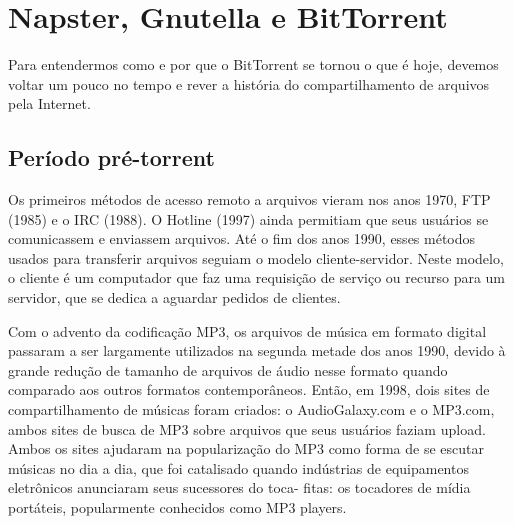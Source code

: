 
\chapter{Napster, Gnutella e BitTorrent}

\begin{comment}
Vou contar a história do BitTorrent, desde o aumento do uso de
transferências de dados via internet, passando pela criação de protocolos e softwares
usados para baixar arquivos de forma ilegal, até a sua criação e o boom de usuários que
o utilizam para essa motivação. Em paralelo, discutirei os motivos legais pelos quais os
softwares anteriores foram descontinuados, que influenciaram diretamente na sua criação.

Separarei em 3 períodos: o antes, a criação e as consequências disso no mundo.
\end{comment}

Para entendermos como e por que o BitTorrent se tornou o que é hoje, devemos voltar um
pouco no tempo e rever a história do compartilhamento de arquivos pela Internet.

\section{Período pré-torrent}

Os primeiros métodos de acesso remoto a arquivos vieram nos anos 1970, FTP (1985) e o
IRC (1988). O Hotline (1997) ainda permitiam que seus usuários se comunicassem e
enviassem arquivos. Até o fim dos anos 1990, esses métodos usados para transferir arquivos seguiam
o modelo cliente-servidor. Neste modelo, o cliente é um computador que faz uma requisição
de serviço ou recurso para um servidor, que se dedica a aguardar pedidos de clientes.

Com o advento da codificação MP3, os arquivos de música em formato digital passaram a ser
largamente utilizados na segunda metade dos anos 1990, devido à grande redução de tamanho
de arquivos de áudio nesse formato quando comparado aos outros formatos contemporâneos.
Então, em 1998, dois sites de compartilhamento de músicas foram criados: o
AudioGalaxy.com e o MP3.com, ambos sites de busca de MP3 sobre arquivos que seus usuários
faziam upload. Ambos os sites ajudaram na popularização do MP3 como forma de se escutar
músicas no dia a dia, que foi catalisado quando indústrias de equipamentos eletrônicos
anunciaram seus sucessores do toca- fitas: os tocadores de mídia portáteis, popularmente
conhecidos como MP3 players.

